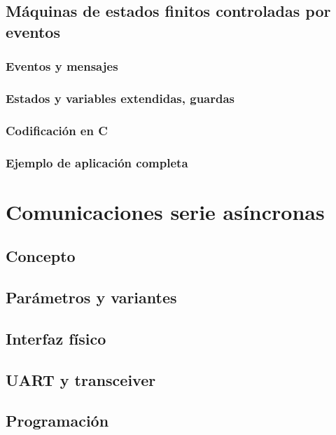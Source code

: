\documentclass[a4paper]{book}
\begin{document}
\subsection{Máquinas de estados finitos controladas por eventos}

\subsubsection{Eventos y mensajes}

\subsubsection{Estados y variables extendidas, guardas}

\subsubsection{Codificación en C}

\subsubsection{Ejemplo de aplicación completa}

\section{Comunicaciones serie asíncronas}

\subsection{Concepto}

\subsection{Parámetros y variantes}

\subsection{Interfaz físico}

\subsection{UART y transceiver}

\subsection{Programación}
\end{document}
